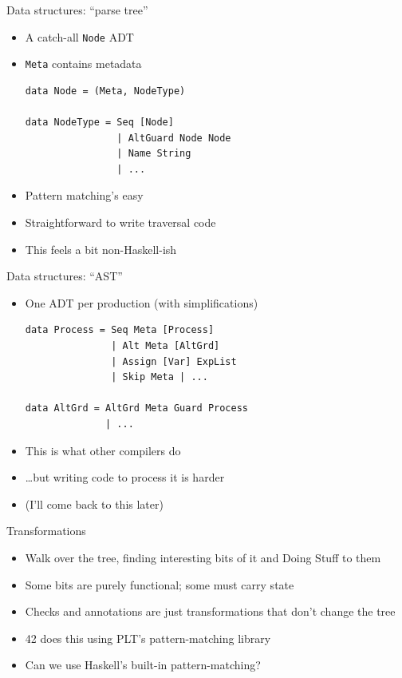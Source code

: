 \documentclass[adam,pdf,slideColor]{prosper}
\begin{document}
\begin{slide}{Data structures: ``parse tree''}
\begin{itemize}
\item A catch-all \verb|Node| ADT
\item \verb|Meta| contains metadata
\begin{verbatim}
data Node = (Meta, NodeType)

data NodeType = Seq [Node]
                | AltGuard Node Node
                | Name String
                | ...
\end{verbatim}
\item Pattern matching's easy
\item Straightforward to write traversal code
\item This feels a bit non-Haskell-ish
\end{itemize}
\end{slide}

\begin{slide}{Data structures: ``AST''}
\begin{itemize}
\item One ADT per production (with simplifications)
\begin{verbatim}
data Process = Seq Meta [Process]
               | Alt Meta [AltGrd]
               | Assign [Var] ExpList
               | Skip Meta | ...

data AltGrd = AltGrd Meta Guard Process
              | ...
\end{verbatim}
\item This is what other compilers do
\item \ldots but writing code to process it is harder
\item (I'll come back to this later)
\end{itemize}
\end{slide}

\begin{slide}{Transformations}
\begin{itemize}
\item Walk over the tree, finding interesting bits of it and Doing
  Stuff to them
\item Some bits are purely functional; some must carry state
\item Checks and annotations are just transformations that don't
  change the tree
\item 42 does this using PLT's pattern-matching library
\item Can we use Haskell's built-in pattern-matching?
\end{itemize}
\end{slide}
\end{document}
